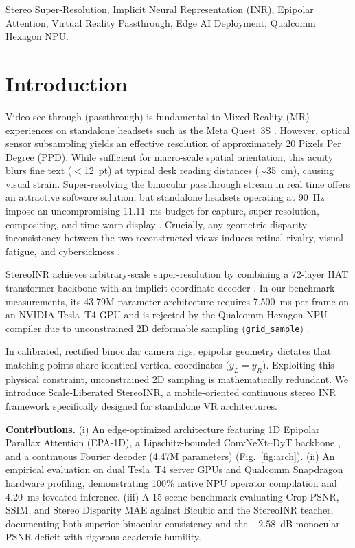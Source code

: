 \documentclass[conference]{IEEEtran}
\newcommand{\ours}{Scale-Liberated StereoINR}
\begin{document}
\begin{IEEEkeywords}
Stereo Super-Resolution, Implicit Neural Representation (INR), Epipolar Attention, Virtual Reality Passthrough, Edge AI Deployment, Qualcomm Hexagon NPU.
\end{IEEEkeywords}

\section{Introduction}
Video see-through (passthrough) is fundamental to Mixed Reality (MR) experiences on standalone headsets such as the Meta Quest~3S \cite{quest3_optics}. However, optical sensor subsampling yields an effective resolution of approximately 20 Pixels Per Degree (PPD). While sufficient for macro-scale spatial orientation, this acuity blurs fine text ($<$12~pt) at typical desk reading distances ($\sim$35~cm), causing visual strain. Super-resolving the binocular passthrough stream in real time offers an attractive software solution, but standalone headsets operating at 90~Hz impose an uncompromising 11.11~ms budget for capture, super-resolution, compositing, and time-warp display \cite{vst_latency, motion_to_photon}. Crucially, any geometric disparity inconsistency between the two reconstructed views induces retinal rivalry, visual fatigue, and cybersickness \cite{retinal_rivalry, binocular_fusion, simulator_sickness}.

StereoINR \cite{stereoinr} achieves arbitrary-scale super-resolution by combining a 72-layer HAT transformer backbone \cite{hat} with an implicit coordinate decoder \cite{liif}. In our benchmark measurements, its 43.79M-parameter architecture requires 7{,}500~ms per frame on an NVIDIA Tesla~T4 GPU and is rejected by the Qualcomm Hexagon NPU compiler due to unconstrained 2D deformable sampling (\texttt{grid\_sample}) \cite{qnn_sdk}. 

In calibrated, rectified binocular camera rigs, epipolar geometry dictates that matching points share identical vertical coordinates ($y_L = y_R$). Exploiting this physical constraint, unconstrained 2D sampling is mathematically redundant. We introduce \ours{}, a mobile-oriented continuous stereo INR framework specifically designed for standalone VR architectures.

\textbf{Contributions.} (i) An edge-optimized architecture featuring 1D Epipolar Parallax Attention (EPA-1D), a Lipschitz-bounded ConvNeXt--DyT backbone \cite{convnext, dyt}, and a continuous Fourier decoder \cite{lte, ultrasr} (4.47M parameters) (Fig.~\ref{fig:arch}). (ii) An empirical evaluation on dual Tesla~T4 server GPUs and Qualcomm Snapdragon hardware profiling, demonstrating 100\% native NPU operator compilation and 4.20~ms foveated inference. (iii) A 15-scene benchmark evaluating Crop PSNR, SSIM, and Stereo Disparity MAE against Bicubic and the StereoINR teacher, documenting both superior binocular consistency and the $-2.58$~dB monocular PSNR deficit with rigorous academic humility.
\end{document}
